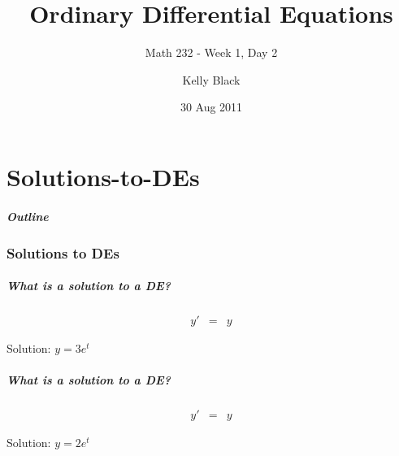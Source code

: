 \part{Solutions-to-DEs}


\title{Ordinary Differential Equations}
\subtitle{Math 232 - Week 1, Day 2}

\author{Kelly Black}
\date{30 Aug 2011}

\begin{frame}
  \titlepage
\end{frame}

\begin{frame}
  \frametitle{Outline}
\end{frame}


\section{Solutions to DEs}


\begin{frame}
  \frametitle{What is a solution to a DE?}

  \begin{eqnarray*}
    y' & = & y
  \end{eqnarray*}

  Solution: $y=3e^t$


\end{frame}


\begin{frame}
  \frametitle{What is a solution to a DE?}

  \begin{eqnarray*}
    y' & = & y
  \end{eqnarray*}

  Solution: $y=2e^t$



\end{frame}


